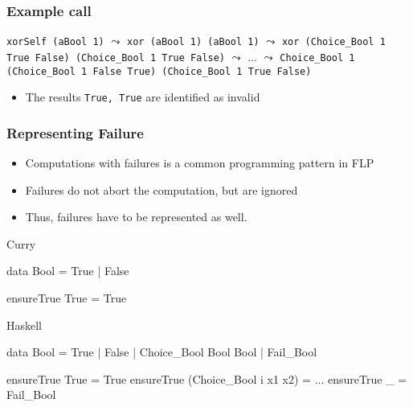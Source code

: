 \documentclass[utf8,handout]{beamer}
\begin{document}
\begin{frame}[fragile]
\frametitle{Example call}
\begin{example}
\verb!xorSelf (aBool 1)!
$\leadsto$ \verb!xor (aBool 1) (aBool 1)!
$\leadsto$ \verb!xor (Choice_Bool 1 True False) (Choice_Bool 1 True False)!
$\leadsto$ $\dots$
$\leadsto$ \verb!Choice_Bool 1 (Choice_Bool 1 False True) (Choice_Bool 1 True False)!
\end{example}

\begin{itemize}
\item The results \verb!True, True! are identified as invalid
\end{itemize}
\end{frame}


\begin{frame}[fragile]
\frametitle{Representing Failure}
\begin{itemize}
 \item Computations with failures is a common programming pattern in FLP
 \item Failures do not abort the computation, but are ignored
 \item Thus, failures have to be represented as well.
\end{itemize}

\begin{block}{Curry}
\begin{semiverbatim}
data Bool = True | False

ensureTrue True = True
\end{semiverbatim}
\end{block}

\begin{block}{Haskell}
\begin{semiverbatim}
data Bool = True | False | Choice_Bool Bool Bool | Fail_Bool

ensureTrue True                  = True
ensureTrue (Choice_Bool i x1 x2) = ...
ensureTrue _                     = Fail_Bool
\end{semiverbatim}
\end{block}
\end{frame}
\end{document}
